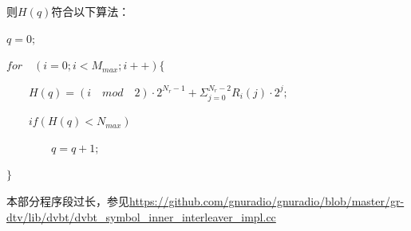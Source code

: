 		
		\par 则$H(q)$符合以下算法：
		\par\noindent $q=0;$
		\par\noindent $for\quad (i=0;i<M_{max};i++)\{$
		\par\noindent $\qquad H(q)=(i\quad mod\quad 2)\cdot 2^{N_r-1}+\Sigma_{j=0}^{N_r-2}R_i(j)\cdot 2^j;$
		\par\noindent $\qquad if(H(q)<N_{max})$
		\par\noindent $\qquad\qquad q=q+1;$
		\par\noindent $\}$
		\par 本部分程序段过长，参见\href{https://github.com/gnuradio/gnuradio/blob/master/gr-dtv/lib/dvbt/dvbt_symbol_inner_interleaver_impl.cc}{https://github.com/gnuradio/gnuradio/blob/master/gr-dtv/lib/dvbt/dvbt\_symbol\_inner\_interleaver\_impl.cc}
